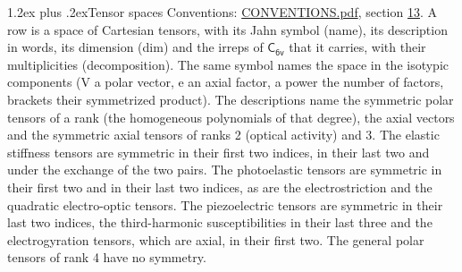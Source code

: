 \documentclass[10pt,a4paper]{article}
\makeatletter
\renewcommand\section{\@startsection{section}{1}{\z@}{-3ex plus -1ex minus -.2ex}%
  {1.2ex plus .2ex}{\normalfont\large\sffamily\bfseries\color{parttitle}}}
\numberwithin{equation}{section}
\newcommand{\grp}[1]{\mathsf{#1}}
\makeatother
\begin{document}
\section{Tensor spaces}\label{s:tensor_spaces}
Conventions: \href{../../CONVENTIONS.pdf}{CONVENTIONS.pdf}, section \href{../../CONVENTIONS.pdf\#conv.13}{13}.
\leavevmode\label{n:head.name}\label{n:head.description}\label{n:head.dim}\label{n:head.decomposition}A row is a space of Cartesian tensors, with its Jahn symbol (name), its description in words, its dimension (dim) and the irreps of $\grp{C_{6v}}$ that it carries, with their multiplicities (decomposition). \label{n:label.jahn}The same symbol names the space in the isotypic components (V a polar vector, e an axial factor, a power the number of factors, brackets their symmetrized product). The descriptions name the symmetric polar tensors of a rank (the homogeneous polynomials of that degree), the axial vectors and the symmetric axial tensors of ranks 2 (optical activity) and 3. The elastic stiffness tensors are symmetric in their first two indices, in their last two and under the exchange of the two pairs. The photoelastic tensors are symmetric in their first two and in their last two indices, as are the electrostriction and the quadratic electro-optic tensors. The piezoelectric tensors are symmetric in their last two indices, the third-harmonic susceptibilities in their last three and the electrogyration tensors, which are axial, in their first two. The general polar tensors of rank 4 have no symmetry.
\end{document}
